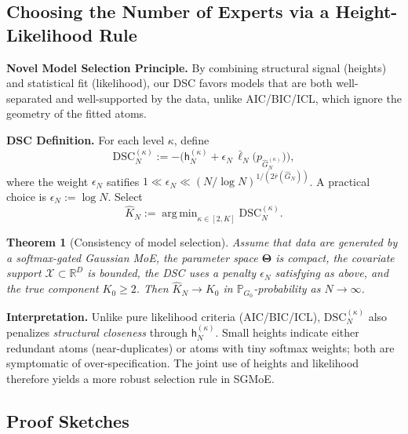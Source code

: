 \documentclass[twoside]{article}
\newcommand{\height}{\mathsf{h}}
\theoremstyle{plain}
\newtheorem{theorem}{Theorem}
\theoremstyle{definition}
\theoremstyle{plain}
\def\vTheta{{\bm{\Theta}}}
\def\sP{{\mathbb{P}}}
\newcommand{\R}{\mathbb{R}}
\newcommand{\cX}{\mathcal{X}}
\DeclareMathOperator*{\argmin}{arg\,min}
\begin{document}
\subsection{Choosing the Number of Experts via a Height-Likelihood Rule}
\label{subsec_order_selection}

{\bf Novel Model Selection Principle.}
By combining structural signal (heights) and statistical fit (likelihood), our DSC favors models that are both well-separated and well-supported by the data, unlike AIC/BIC/ICL, which ignore the geometry of the fitted atoms.

{\bf DSC Definition.}
For each level $\kappa$, define
\[
\mathrm{DSC}_N^{(\kappa)}:=-\Big(\height_N^{(\kappa)}+\epsilon_N\,\bar\ell_N\!\big(p_{\widehat G_N^{(\kappa)}}\big)\Big),
\]
where the weight $\epsilon_N$ satifies $1\ll \epsilon_N \ll (N/\log N)^{1/(2\bar r(\widehat G_N))}$.
 A practical choice is $\epsilon_N:=\log N$. Select
\[
\widehat K_N:=\argmin_{\kappa\in[2,K]}\mathrm{DSC}_N^{(\kappa)}.
\]

\begin{theorem}[Consistency of model selection]
\label{thm_order_consistency}
Assume that data are generated by a softmax-gated Gaussian MoE, the parameter space $\vTheta$ is compact, the covariate support $\cX \subset \R^D$ is bounded, the DSC uses a penalty $\epsilon_N$ satisfying as above, and the true component $K_0\ge2$. Then $\widehat K_N\to K_0$ in $\sP_{G_0}$-probability as $N\to\infty$.
\end{theorem}

{\bf Interpretation.}
Unlike pure likelihood criteria (AIC/BIC/ICL), $\mathrm{DSC}_N^{(\kappa)}$ also penalizes \emph{structural closeness} through $\height_N^{(\kappa)}$. Small heights indicate either redundant atoms (near-duplicates) or atoms with tiny softmax weights; both are symptomatic of over-specification. The joint use of heights and likelihood therefore yields a more robust selection rule in SGMoE.

\subsection{Proof Sketches}
\end{document}
